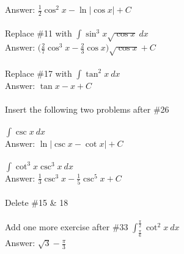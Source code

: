\documentclass[11pt]{report}
\begin{document}
Answer: $\frac{1}{2}\cos^2 x - \ln |\cos x| + C$\\ \\

Replace \#11 with $\int \sin^3 x \sqrt {\cos x} ~dx$\\

Answer: $\bigl(\frac{2}{7} \cos^3 x - \frac{2}{3} \cos x\bigr) \sqrt {\cos x} + C$\\ \\

Replace \#17 with $\int \tan^2 x~dx$\\

Answer: $\tan x - x +  C$\\ \\

Insert the following two problems after \#26\\ \\

$\int \csc x~dx$\\

Answer: $\ln |\csc x - \cot x| +  C$\\ \\

$\int \cot^3 x \csc^3 x~dx$\\

Answer: $\frac{1}{3} \csc^3 x - \frac{1}{5} \csc^5 x +  C$\\ \\

Delete \#15 \& 18\\ \\

Add one more exercise after \#33 $\displaystyle \int_{\frac{\pi}{6}}^{\frac{\pi}{2}} \cot^2 x~dx$\\

Answer: $\sqrt 3 - \frac{\pi}{3}$\\ \\
\end{document}
